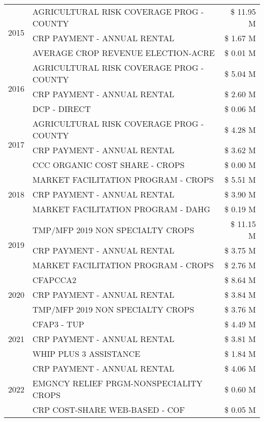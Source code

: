 \begin{tabular}{llr}
\cline{1-3}
\multirow[t]{3}{*}{2015} & AGRICULTURAL RISK COVERAGE PROG - COUNTY & \$ 11.95 M \\
 & CRP PAYMENT - ANNUAL RENTAL & \$ 1.67 M \\
 & AVERAGE CROP REVENUE ELECTION-ACRE & \$ 0.01 M \\
\cline{1-3}
\multirow[t]{3}{*}{2016} & AGRICULTURAL RISK COVERAGE PROG - COUNTY & \$ 5.04 M \\
 & CRP PAYMENT - ANNUAL RENTAL & \$ 2.60 M \\
 & DCP - DIRECT & \$ 0.06 M \\
\cline{1-3}
\multirow[t]{3}{*}{2017} & AGRICULTURAL RISK COVERAGE PROG - COUNTY & \$ 4.28 M \\
 & CRP PAYMENT - ANNUAL RENTAL & \$ 3.62 M \\
 & CCC ORGANIC COST SHARE - CROPS & \$ 0.00 M \\
\cline{1-3}
\multirow[t]{3}{*}{2018} & MARKET FACILITATION PROGRAM - CROPS & \$ 5.51 M \\
 & CRP PAYMENT - ANNUAL RENTAL & \$ 3.90 M \\
 & MARKET FACILITATION PROGRAM - DAHG & \$ 0.19 M \\
\cline{1-3}
\multirow[t]{3}{*}{2019} & TMP/MFP 2019 NON SPECIALTY CROPS & \$ 11.15 M \\
 & CRP PAYMENT - ANNUAL RENTAL & \$ 3.75 M \\
 & MARKET FACILITATION PROGRAM - CROPS & \$ 2.76 M \\
\cline{1-3}
\multirow[t]{3}{*}{2020} & CFAPCCA2 & \$ 8.64 M \\
 & CRP PAYMENT - ANNUAL RENTAL & \$ 3.84 M \\
 & TMP/MFP 2019 NON SPECIALTY CROPS & \$ 3.76 M \\
\cline{1-3}
\multirow[t]{3}{*}{2021} & CFAP3 - TUP & \$ 4.49 M \\
 & CRP PAYMENT - ANNUAL RENTAL & \$ 3.81 M \\
 & WHIP PLUS 3 ASSISTANCE & \$ 1.84 M \\
\cline{1-3}
\multirow[t]{3}{*}{2022} & CRP PAYMENT - ANNUAL RENTAL & \$ 4.06 M \\
 & EMGNCY RELIEF PRGM-NONSPECIALITY CROPS & \$ 0.60 M \\
 & CRP COST-SHARE WEB-BASED - COF & \$ 0.05 M \\
\cline{1-3}
\bottomrule
\end{tabular}
